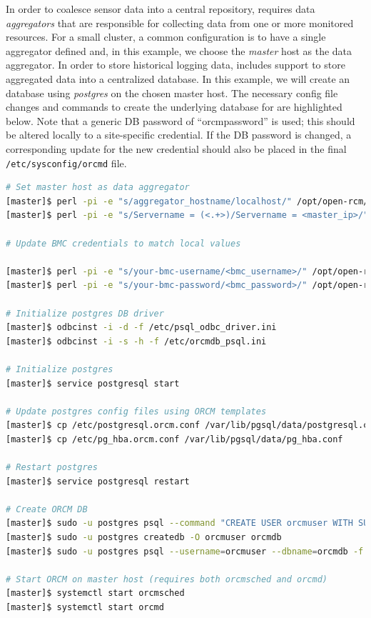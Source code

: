 \documentclass[letterpaper]{article}
\begin{document}
In order to coalesce sensor data into a central repository, \ORCM{} requires
data {\em aggregators} that are responsible for collecting data from one or
more monitored resources. For a small cluster, a common configuration is to
have a single aggregator defined and, in this example, we choose the {\em master} host
as the data aggregator. In order to store historical logging data, \ORCM{}
includes support to store aggregated data into a centralized database. In this
example, we will create an \ORCM{} database using {\em postgres} on the chosen
master host. The necessary config file changes and commands to create the
underlying database for \ORCM{} are highlighted below. Note that a generic DB
password of ``orcmpassword'' is used; this should be altered locally to a
site-specific credential. If the DB password is changed, a corresponding update
for the new credential should also be placed in the final
\texttt{/etc/sysconfig/orcmd} file.

\begin{lstlisting}[language=bash,keywords={},upquote=true,keepspaces]
# Set master host as data aggregator
[master]$ perl -pi -e "s/aggregator_hostname/localhost/" /opt/open-rcm/etc/orcm-site.xml
[master]$ perl -pi -e "s/Servername = (<.+>)/Servername = <master_ip>/" /etc/orcmdb_psql.ini

# Update BMC credentials to match local values

[master]$ perl -pi -e "s/your-bmc-username/<bmc_username>/" /opt/open-rcm/etc/openmpi-mca-params.conf
[master]$ perl -pi -e "s/your-bmc-password/<bmc_password>/" /opt/open-rcm/etc/openmpi-mca-params.conf

# Initialize postgres DB driver
[master]$ odbcinst -i -d -f /etc/psql_odbc_driver.ini
[master]$ odbcinst -i -s -h -f /etc/orcmdb_psql.ini 

# Initialize postgres
[master]$ service postgresql start   

# Update postgres config files using ORCM templates
[master]$ cp /etc/postgresql.orcm.conf /var/lib/pgsql/data/postgresql.conf
[master]$ cp /etc/pg_hba.orcm.conf /var/lib/pgsql/data/pg_hba.conf

# Restart postgres
[master]$ service postgresql restart 

# Create ORCM DB
[master]$ sudo -u postgres psql --command "CREATE USER orcmuser WITH SUPERUSER PASSWORD 'orcmpassword';"
[master]$ sudo -u postgres createdb -O orcmuser orcmdb
[master]$ sudo -u postgres psql --username=orcmuser --dbname=orcmdb -f /etc/orcmdb_psql.sql

# Start ORCM on master host (requires both orcmsched and orcmd)
[master]$ systemctl start orcmsched
[master]$ systemctl start orcmd
\end{lstlisting}
\end{document}
